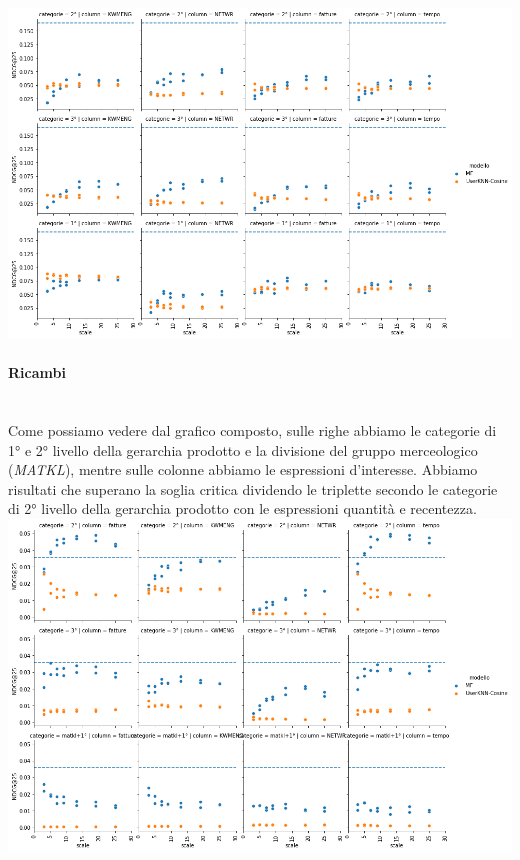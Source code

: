 \includegraphics[width=16cm]{figures/risultati_minmax_categoria_macchine.png}
\newpage

\paragraph{Ricambi}\mbox{} \\
Come possiamo vedere dal grafico composto, sulle righe abbiamo le categorie di 1° e 2° livello della gerarchia prodotto e la divisione del gruppo merceologico (\textit{MATKL}), mentre sulle colonne abbiamo le espressioni d'interesse. Abbiamo risultati che superano la soglia critica dividendo le triplette secondo le categorie di 2° livello della gerarchia prodotto con le espressioni quantità e recentezza.\\

\includegraphics[width=16cm]{figures/risultati_minmax_categoria_ricambi.png}

